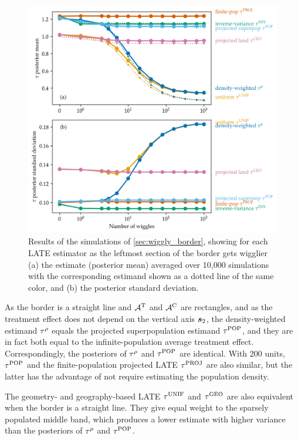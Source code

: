 \documentclass[letter,12pt]{article}
\begin{document}
\begin{figure}[!tb]
\centering
\includegraphics[height=0.6\textheight]{../figures/wiggly_boundaries_posteriors.png}
\caption{\label{fig:wiggly_boundaries_posteriors} Results of the simulations of \autoref{sec:wiggly_border}, showing for each LATE estimator as the leftmost section of the border gets wigglier (a) the estimate (posterior mean) averaged over 10,000 simulations with the corresponding estimand shown as a dotted line of the same color, and (b) the posterior standard deviation.}
\end{figure}
    
As the border is a straight line and \(\mathcal{A}{}^{\mathrm{T}}\) and \(\mathcal{A}{}^{\mathrm{C}}\) are rectangles,
and as the treatment effect does not depend on the vertical axis \(\bm{s}_2\),
the density-weighted estimand \(\tau^{\rho}\) equals the projected superpopulation estimand \(\tau^{\mathrm{POP}}\),
and they are in fact both equal to the infinite-population average treatment effect.
Correspondingly, the posteriors of \(\tau^{\rho}\) and \(\tau^{\mathrm{POP}}\) are identical.
With 200 units, \(\tau^{\mathrm{POP}}\) and the finite-population projected LATE \(\tau^{\mathrm{PROJ}}\) are also similar, but the latter has the advantage of not require estimating the population density.

The geometry- and geography-based LATE \(\tau^{\mathrm{UNIF}}\) and \(\tau^{\mathrm{GEO}}\) are also equivalent when the border is a straight line.
They give equal weight to the sparsely populated middle band, which produces a lower estimate with higher variance than the posteriors of \(\tau^{\rho}\) and \(\tau^{\mathrm{POP}}\).
\end{document}
